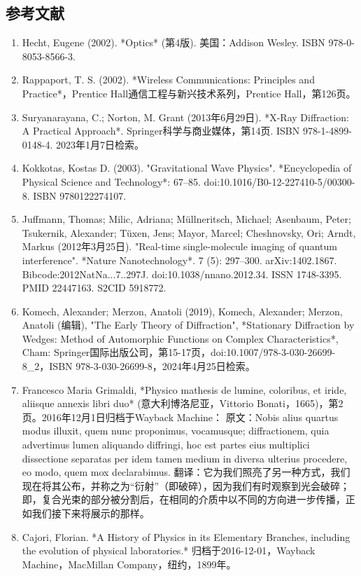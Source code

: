 \subsection{参考文献}
\begin{enumerate}
\item Hecht, Eugene (2002). *Optics* (第4版). 美国：Addison Wesley. ISBN 978-0-8053-8566-3.
\item Rappaport, T. S. (2002). *Wireless Communications: Principles and Practice*，Prentice Hall通信工程与新兴技术系列，Prentice Hall，第126页。
\item Suryanarayana, C.; Norton, M. Grant (2013年6月29日). *X-Ray Diffraction: A Practical Approach*. Springer科学与商业媒体，第14页. ISBN 978-1-4899-0148-4. 2023年1月7日检索。
\item Kokkotas, Kostas D. (2003). "Gravitational Wave Physics". *Encyclopedia of Physical Science and Technology*: 67–85. doi:10.1016/B0-12-227410-5/00300-8. ISBN 9780122274107.
\item Juffmann, Thomas; Milic, Adriana; Müllneritsch, Michael; Asenbaum, Peter; Tsukernik, Alexander; Tüxen, Jens; Mayor, Marcel; Cheshnovsky, Ori; Arndt, Markus (2012年3月25日). "Real-time single-molecule imaging of quantum interference". *Nature Nanotechnology*. 7 (5): 297–300. arXiv:1402.1867. Bibcode:2012NatNa...7..297J. doi:10.1038/nnano.2012.34. ISSN 1748-3395. PMID 22447163. S2CID 5918772.
\item Komech, Alexander; Merzon, Anatoli (2019), Komech, Alexander; Merzon, Anatoli (编辑), "The Early Theory of Diffraction", *Stationary Diffraction by Wedges: Method of Automorphic Functions on Complex Characteristics*, Cham: Springer国际出版公司，第15-17页，doi:10.1007/978-3-030-26699-8_2，ISBN 978-3-030-26699-8，2024年4月25日检索。
\item Francesco Maria Grimaldi, *Physico mathesis de lumine, coloribus, et iride, aliisque annexis libri duo* (意大利博洛尼亚，Vittorio Bonati，1665)，第2页。2016年12月1日归档于Wayback Machine：
原文：Nobis alius quartus modus illuxit, quem nunc proponimus, vocamusque; diffractionem, quia advertimus lumen aliquando diffringi, hoc est partes eius multiplici dissectione separatas per idem tamen medium in diversa ulterius procedere, eo modo, quem mox declarabimus.
翻译：它为我们照亮了另一种方式，我们现在将其公布，并称之为“衍射”（即破碎），因为我们有时观察到光会破碎；即，复合光束的部分被分割后，在相同的介质中以不同的方向进一步传播，正如我们接下来将展示的那样。
\item Cajori, Florian. *A History of Physics in its Elementary Branches, including the evolution of physical laboratories.* 归档于2016-12-01，Wayback Machine，MacMillan Company，纽约，1899年。

\end{enumerate}
